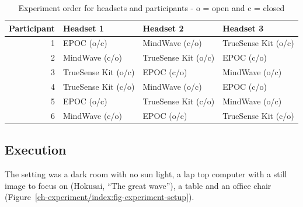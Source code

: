 \documentclass[a4paper,10pt,english,lof,lot,twoside]{puthesis}
\begin{document}
\begin{table}
\capstart
\begin{center}

\begin{tabular}{r l l l}

\toprule
\textsf{\relax 
Participant
} & \textsf{\relax 
Headset 1
} & \textsf{\relax 
Headset 2
} & \textsf{\relax 
Headset 3
}\\
\hline\midrule

1
 & 
EPOC (o/c)
 & 
MindWave (c/o)
 & 
TrueSense Kit (o/c)
\\

2
 & 
MindWave (c/o)
 & 
TrueSense Kit (o/c)
 & 
EPOC (c/o)
\\

3
 & 
TrueSense Kit (o/c)
 & 
EPOC (c/o)
 & 
MindWave (o/c)
\\

4
 & 
TrueSense Kit (c/o)
 & 
MindWave (o/c)
 & 
EPOC (c/o)
\\

5
 & 
EPOC (o/c)
 & 
TrueSense Kit (c/o)
 & 
MindWave (o/c)
\\

6
 & 
MindWave (c/o)
 & 
EPOC (o/c)
 & 
TrueSense Kit (c/o)
\\
\hline\bottomrule

\end{tabular}
\caption[Experiment order for headsets and participants]{Experiment order for headsets and participants - o = open and c = closed}\label{ch-experiment/index:table-experiment-headset-latin-square}
\end{center}
\end{table}


\subsection{Execution}
\label{ch-experiment/index:table-experiment-headset-latin-square}\label{ch-experiment/index:execution}
The setting was a dark room with no sun light, a lap top computer with
a still image to focus on (Hokusai, ``The great wave''), a table and an office
chair (Figure \ref{ch-experiment/index:fig-experiment-setup}).
\end{document}

